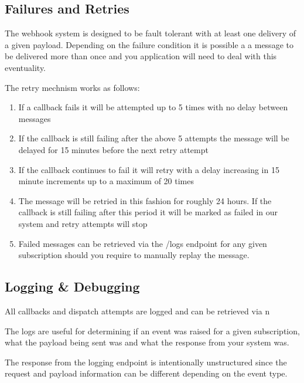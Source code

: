 \documentclass[letterpaper,10pt,english]{sphinxmanual}
\begin{document}
\subsection{Failures and Retries}
\label{\detokenize{webhooks/web-hooks:failures-and-retries}}
The webhook system is designed to be fault tolerant with at least one delivery of a given payload. Depending on the failure condition it is possible a a message to be delivered more than once and you application will need to deal with this eventuality.

The retry mechnism works as follows:
\begin{enumerate}
\item {} 
If a callback fails it will be attempted up to 5 times with no delay between messages

\item {} 
If the callback is still failing after the above 5 attempts the message will be delayed for 15 minutes before the next retry attempt

\item {} 
If the callback continues to fail it will retry with a delay increasing in 15 minute increments up to a maximum of 20 times

\item {} 
The message will be retried in this fashion for roughly 24 hours. If the callback is still failing after this period it will be marked as failed in our system and retry attempts will stop

\item {} 
Failed messages can be retrieved via the /logs endpoint for any given subscription should you require to manually replay the message.

\end{enumerate}


\subsection{Logging \& Debugging}
\label{\detokenize{webhooks/web-hooks:logging-debugging}}
All callbacks and dispatch attempts are logged and can be retrieved via n

The logs are useful for determining if an event was raised for a given subscription, what the payload being sent was and what the response from your system was.

The response from the logging endpoint is intentionally unstructured since the request and payload information can be different depending on the event type.



\renewcommand{\indexname}{Index}
\printindex
\end{document}
